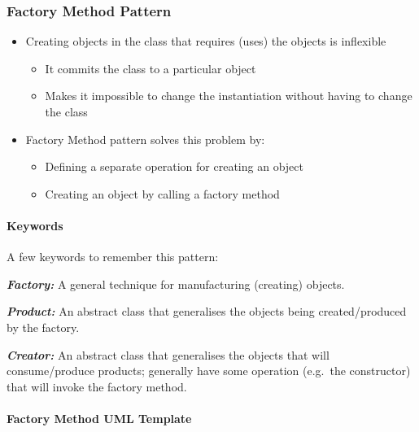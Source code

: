\documentclass[]{article}
\providecommand{\tightlist}{%
  \setlength{\itemsep}{0pt}\setlength{\parskip}{0pt}}
\let\oldparagraph\paragraph
\renewcommand{\paragraph}[1]{\oldparagraph{#1}\mbox{}}
\begin{document}
\hypertarget{factory-method-pattern-1}{%
\subsubsection{Factory Method Pattern}\label{factory-method-pattern-1}}

\begin{itemize}
\tightlist
\item
  Creating objects in the class that requires (uses) the objects is
  inflexible

  \begin{itemize}
  \tightlist
  \item
    It commits the class to a particular object
  \item
    Makes it impossible to change the instantiation without having to
    change the class
  \end{itemize}
\item
  Factory Method pattern solves this problem by:

  \begin{itemize}
  \tightlist
  \item
    Defining a separate operation for creating an object
  \item
    Creating an object by calling a factory method
  \end{itemize}
\end{itemize}

\hypertarget{keywords}{%
\paragraph{Keywords}\label{keywords}}

A few keywords to remember this pattern:

\textbf{\emph{Factory:}} A general technique for manufacturing
(creating) objects.

\textbf{\emph{Product:}} An abstract class that generalises the objects
being created/produced by the factory.

\textbf{\emph{Creator:}} An abstract class that generalises the objects
that will consume/produce products; generally have some operation
(e.g.~the constructor) that will invoke the factory method.

\hypertarget{factory-method-uml-template}{%
\paragraph{Factory Method UML
Template}\label{factory-method-uml-template}}
\end{document}
